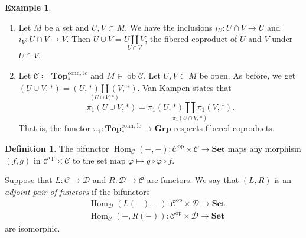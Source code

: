 \documentclass[10pt,letterpaper,cm]{nupset}
\theoremstyle{definition}
\newtheorem*{definition}{Definition}
\newtheorem{exmp}{Example}
\newcommand{\1}{\mathbf{1}}
\renewcommand{\c}{\mathscr{C}}
\renewcommand{\d}{\mathscr{D}}
\newcommand{\0}{\vec 0}
\DeclareMathOperator{\op}{op}
\DeclareMathOperator{\ob}{ob}
\DeclareMathOperator{\Hom}{Hom}
\begin{document}
\begin{exmp} $ $
\begin{enumerate}
\item Let $M$ be a set and $U, V\subset M$. We have the inclusions $i_U : U \cap V \to U$ and $i_V : U \cap V \to V$. Then $U \cup V = \underset{U \cap V}{U \coprod V}$, the fibered coproduct of $U$ and $V$ under $U \cap V$.
\item Let $\c \coloneqq  \mathbf{Top}_{\ast}^{\text{conn, lc}}$ and $M \in \ob \c$. Let $U, V \subset M$ be open. As before, we get $(U \cup V, \ast)= \underset{(U \cap V, {\ast})}{(U, \ast)  \coprod (V, \ast)} $. Van Kampen states that $$\pi_1(U \cup V, \ast) = \underset{\pi_1(U \cap V, \ast)}{\pi_1(U, \ast) \coprod \pi_1(V, \ast)}.$$ That is, the functor $\pi_1: \mathbf{Top}_{\ast}^{\text{conn, lc}}\to \mathbf{Grp}$ respects fibered coproducts. 
\end{enumerate}
\end{exmp}


\begin{definition}
The bifunctor $\Hom_{\c}({-}, {-}) : \c^{\op} \times \c \to \mathbf{Set}$ maps any morphism $(f, g)$ in $\c^{\op} \times \c$ to the set map $\varphi \mapsto g \circ \varphi \circ f$.

Suppose that $L: \c \to \d$ and $R: \d \to \c$ are functors. We say that $(L, R)$ is an \textit{adjoint pair of functors} if the bifunctors
\begin{align*}
& \Hom_{\d}(L(-), -) : \c^{\op} \times \d \to \mathbf{Set}
\\ & \Hom_{\c}(-, R(-)) : \c^{\op} \times \d \to \mathbf{Set} 
\end{align*}
are isomorphic.
\end{definition}
\end{document}
